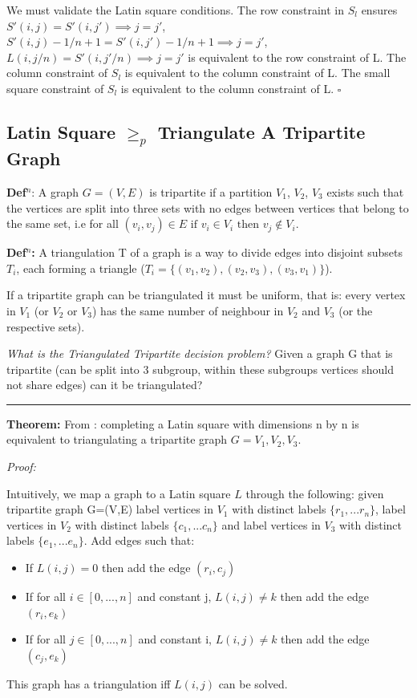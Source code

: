 \documentclass[a4paper,11pt]{report}
\newcounter{row}
\newcounter{col}
\begin{document}
We must validate the Latin square conditions. The row constraint in $S_l$ ensures $S'(i,j)=S'(i,j') \implies j=j'$, $S'(i,j)-1/n+1=S'(i,j')-1/n+1 \implies j=j'$, $L(i,j/n)=S'(i,j'/n) \implies j=j'$ is equivalent to the row constraint of L. The column constraint of $S_l$ is equivalent to the column constraint of L. The small square constraint of $S_l$ is equivalent to the column constraint of L. $\square$

\subsection{Latin Square $\geq_p$ Triangulate A Tripartite Graph}

\textbf{Def$^n$}: A graph $G=(V,E)$ is tripartite if a partition $V_1$, $V_2$, $V_3$ exists such that the vertices are split into three sets with no edges between vertices that belong to the same set, i.e for all $(v_i,v_j) \in E\text{ if } v_i \in V_i\text{ then }v_j \not\in V_i $.

\textbf{Def$^n$:} A triangulation T of a graph is a way to divide edges into disjoint subsets $T_i$, each forming a triangle ($T_i=\{(v_{1}, v_{2}),(v_{2}, v_{3}),(v_{3},v_{1})\}$).

If a tripartite graph can be triangulated it must be uniform, that is: every vertex in $V_1$ (or $V_2$ or $V_3$) has the same number of neighbour in $V_2$ and $V_3$ (or the respective sets).

\textit{What is the Triangulated Tripartite decision problem?} Given a graph G that is tripartite (can be split into 3 subgroup, within these subgroups vertices should not share edges) can it be triangulated?

\noindent\rule{4cm}{0.4pt}

\textbf{Theorem:} From \cite{lsttg}: completing a Latin square with dimensions n by n is equivalent to triangulating a tripartite graph $G= V_1, V_2, V_3$.

\textit{Proof:} 

Intuitively, we map a graph to a Latin square $L$ through the following: 
given tripartite graph G=(V,E) label vertices in $V_1$ with distinct labels $\{r_1,...r_n\}$, label vertices in $V_2$ with distinct labels $\{c_1,...c_n\}$ and label vertices in $V_3$ with distinct labels $\{e_1,...e_n\}$. Add edges such that:
\begin{itemize}
\item{If $L(i,j) = 0$ then add the edge $(r_i,c_j)$ }
\item{If for all $i \in [0,...,n]$ and constant j, $L(i,j) \neq k$ then add the edge $(r_i,e_k)$}
\item{If for all $j \in [0,...,n]$ and constant i, $L(i,j) \neq k$ then add the edge $(c_j,e_k)$}
\end{itemize}
This graph has a triangulation iff $L(i,j)$ can be solved.
\end{document}
